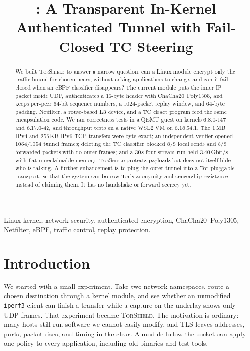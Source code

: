 \documentclass[conference]{IEEEtran}
\title{\sys: A Transparent In-Kernel Authenticated Tunnel with Fail-Closed TC Steering}
\author{
\IEEEauthorblockN{Roshan Srikanth}
\IEEEauthorblockA{Amrita Vishwa Vidyapeetham\\
Email: roshansrikanth21@gmail.com}
\and
\IEEEauthorblockN{Yash Yashuday}
\IEEEauthorblockA{Amrita Vishwa Vidyapeetham\\
Email: yyashuday@gmail.com}
\and
\IEEEauthorblockN{Dr. S. UdhayaKumar}
\IEEEauthorblockA{Amrita Vishwa Vidyapeetham\\
Email: sudhayakumar@ch.amrita.edu}
}
\newcommand{\sys}{\textsc{TorShield}}
\newcommand{\code}[1]{\texttt{#1}}
\begin{document}
\maketitle

\begin{abstract}
We built \sys{} to answer a narrow question: can a Linux module encrypt only the traffic bound for chosen peers, without asking applications to change, and can it fail closed when an eBPF classifier disappears? The current module puts the inner IP packet inside UDP, authenticates a 16-byte header with ChaCha20--Poly1305, and keeps per-peer 64-bit sequence numbers, a 1024-packet replay window, and 64-byte padding. Netfilter, a route-based L3 device, and a TC clsact program feed the same encapsulation code. We ran correctness tests in a QEMU guest on kernels 6.8.0-147 and 6.17.0-42, and throughput tests on a native WSL2 VM on 6.18.54.1. The 1\,MB IPv4 and 256\,KB IPv6 TCP transfers were byte-exact; an independent verifier opened 1054/1054 tunnel frames; deleting the TC classifier blocked 8/8 local sends and 8/8 forwarded packets with no outer frames; and a 30\,s four-stream run held 3.40\,Gbit/s with flat unreclaimable memory. \sys{} protects payloads but does not itself hide who is talking. A further enhancement is to plug the outer tunnel into a Tor pluggable transport, so that the system can borrow Tor's anonymity and censorship resistance instead of claiming them. It has no handshake or forward secrecy yet.
\end{abstract}

\begin{IEEEkeywords}
Linux kernel, network security, authenticated encryption, ChaCha20--Poly1305, Netfilter, eBPF, traffic control, replay protection.
\end{IEEEkeywords}

\section{Introduction}

We started with a small experiment. Take two network namespaces, route a chosen destination through a kernel module, and see whether an unmodified \code{iperf3} client can finish a transfer while a capture on the underlay shows only UDP frames. That experiment became \sys{}. The motivation is ordinary: many hosts still run software we cannot easily modify, and TLS leaves addresses, ports, packet sizes, and timing in the clear. A module below the socket can apply one policy to every application, including old binaries and test tools.
\end{document}
